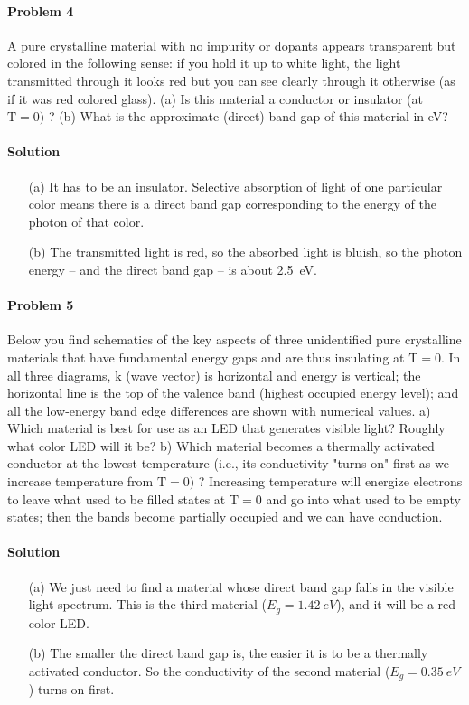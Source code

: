 \documentclass[hyperref, a4paper]{article}
\begin{document}
\paragraph{Problem 4} A pure crystalline material with no impurity or dopants appears transparent but colored in the following sense: if you hold it up to white light, the light transmitted through it looks red but you can see clearly through it otherwise (as if it was red colored glass).
(a) Is this material a conductor or insulator (at $\mathrm{T}=0)$ ?
(b) What is the approximate (direct) band gap of this material in eV?

\paragraph{Solution} \begin{itemize}
\item[(a)] It has to be an insulator.
Selective absorption of light of one particular color 
means there is a direct band gap corresponding to the energy 
of the photon of that color.
\item[(b)] The transmitted light is red, 
so the absorbed light is bluish,
so the photon energy -- and the direct band gap -- 
is about \SI{2.5}{eV}.
\end{itemize}

\paragraph{Problem 5} Below you find schematics of the key aspects of three unidentified pure crystalline materials that have fundamental energy gaps and are thus insulating at $\mathrm{T}=0$. In all three diagrams, $\mathrm{k}$ (wave vector) is horizontal and energy is vertical; the horizontal line is the top of the valence band (highest occupied energy level); and all the low-energy band edge differences are shown with numerical values.
a) Which material is best for use as an LED that generates visible light? Roughly what color LED will it be?
b) Which material becomes a thermally activated conductor at the lowest temperature (i.e., its conductivity "turns on" first as we increase temperature from $\mathrm{T}=0)$ ? Increasing temperature will energize electrons to leave what used to be filled states at $\mathrm{T}=0$ and go into what used to be empty states; then the bands become partially occupied and we can have conduction.

\paragraph{Solution} \begin{itemize}
\item[(a)] We just need to find a material whose direct band gap falls in the visible light spectrum.
This is the third material ($E_g = \SI{1.42}{eV}$), 
and it will be a red color LED.
\item[(b)] The smaller the direct band gap is, 
the easier it is to be a thermally activated conductor.
So the conductivity of the second material ($E_{g} = \SI{0.35}{eV}$) 
turns on first.
\end{itemize}
\end{document}
